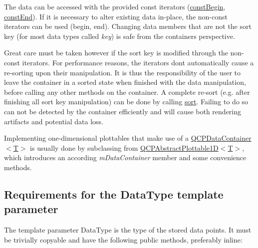 The data can be accessed with the provided const iterators (\hyperlink{class_q_c_p_data_container_a02360beeb3484df7c20f20c8f3ed4bb2}{const\+Begin}, \hyperlink{class_q_c_p_data_container_ad007d9955a4fb2ec1f7e07532b59d169}{const\+End}). If it is necessary to alter existing data in-\/place, the non-\/const iterators can be used (begin, end). Changing data members that are not the sort key (for most data types called {\itshape key}) is safe from the container\textquotesingle{}s perspective.

Great care must be taken however if the sort key is modified through the non-\/const iterators. For performance reasons, the iterators don\textquotesingle{}t automatically cause a re-\/sorting upon their manipulation. It is thus the responsibility of the user to leave the container in a sorted state when finished with the data manipulation, before calling any other methods on the container. A complete re-\/sort (e.\+g. after finishing all sort key manipulation) can be done by calling \hyperlink{class_q_c_p_data_container_a75da92e33063b63d6da5014683591d45}{sort}. Failing to do so can not be detected by the container efficiently and will cause both rendering artifacts and potential data loss.

Implementing one-\/dimensional plottables that make use of a \hyperlink{class_q_c_p_data_container}{Q\+C\+P\+Data\+Container$<$\+T$>$} is usually done by subclassing from \hyperlink{class_q_c_p_abstract_plottable1_d}{Q\+C\+P\+Abstract\+Plottable1D$<$T$>$}, which introduces an according {\itshape m\+Data\+Container} member and some convenience methods.\hypertarget{class_q_c_p_data_container_qcpdatacontainer-datatype}{}\subsection{Requirements for the Data\+Type template parameter}\label{class_q_c_p_data_container_qcpdatacontainer-datatype}
The template parameter {\ttfamily Data\+Type} is the type of the stored data points. It must be trivially copyable and have the following public methods, preferably inline\+:

